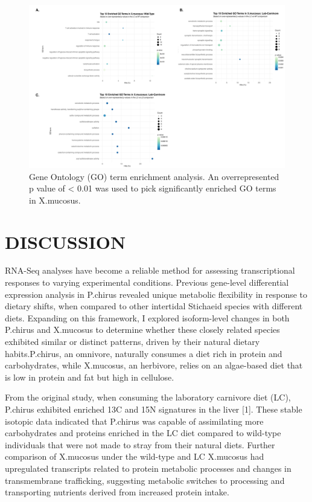 \documentclass[12pt,]{article}
\begin{document}
\begin{figure}[htbp]
\centering
\includegraphics[width=\textwidth]{output/figures/combined-xm-lc_wt_DE_GOseq_enrichment_plot.png}
\caption{Gene Ontology (GO) term enrichment analysis. An overrepresented p value of < 0.01 was used to pick significantly enriched GO terms in X.mucosus.}
\end{figure}

\section{DISCUSSION}\label{discussion}

RNA-Seq analyses have become a reliable method for assessing
transcriptional responses to varying experimental conditions. Previous
gene-level differential expression analysis in P.chirus revealed unique
metabolic flexibility in response to dietary shifts, when compared to
other intertidal Stichaeid species with different diets. Expanding on
this framework, I explored isoform-level changes in both P.chirus and
X.mucosus to determine whether these closely related species exhibited
similar or distinct patterns, driven by their natural dietary
habits.P.chirus, an omnivore, naturally consumes a diet rich in protein
and carbohydrates, while X.mucosus, an herbivore, relies on an
algae-based diet that is low in protein and fat but high in cellulose.

From the original study, when consuming the laboratory carnivore diet
(LC), P.chirus exhibited enriched 13C and 15N signatures in the liver
{[}1{]}. These stable isotopic data indicated that P.chirus was capable
of assimilating more carbohydrates and proteins enriched in the LC diet
compared to wild-type individuals that were not made to stray from their
natural diets. Further comparison of X.mucosus under the wild-type and
LC X.mucosus had upregulated transcripts related to protein metabolic
processes and changes in transmembrane trafficking, suggesting metabolic
switches to processing and transporting nutrients derived from increased
protein intake.
\end{document}
